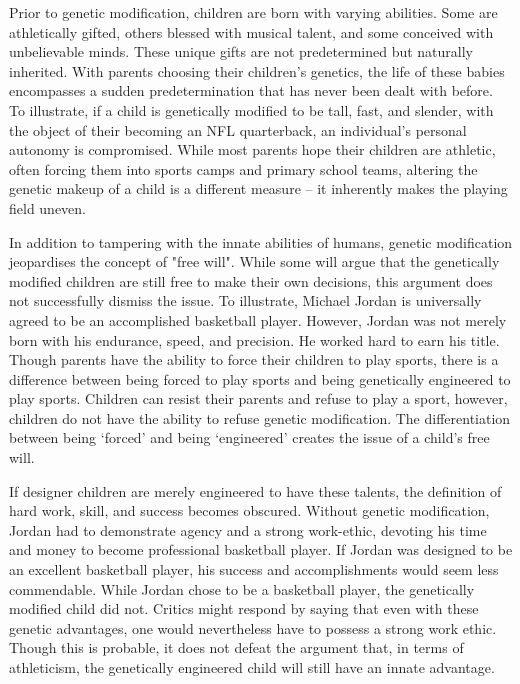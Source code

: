    Prior to genetic modification, children are born with varying
   abilities. Some are athletically gifted, others blessed with musical
   talent, and some conceived with unbelievable minds. These unique gifts
   are not predetermined but naturally inherited. With parents choosing
   their children's genetics, the life of these babies encompasses a
   sudden predetermination that has never been dealt with before. To
   illustrate, if a child is genetically modified to be tall, fast, and
   slender, with the object of their becoming an NFL quarterback, an
   individual's personal autonomy is compromised. While most parents hope
   their children are athletic, often forcing them into sports camps and
   primary school teams, altering the genetic makeup of a child is a
   different measure -- it inherently makes the playing field uneven.

   In addition to tampering with the innate abilities of humans, genetic
   modification jeopardises the concept of "free will".  While some will
   argue that the genetically modified children are still free to make
   their own decisions, this argument does not successfully dismiss the
   issue. To illustrate, Michael Jordan is universally agreed to be an
   accomplished basketball player. However, Jordan was not merely born
   with his endurance, speed, and precision. He worked hard to earn his
   title. Though parents have the ability to force their children to play
   sports, there is a difference between being forced to play sports and
   being genetically engineered to play sports. Children can resist their
   parents and refuse to play a sport, however, children do not have the
   ability to refuse genetic modification. The differentiation between
   being `forced' and being `engineered' creates the issue of a child's
   free will.

   If designer children are merely engineered to have these talents, the
   definition of hard work, skill, and success becomes obscured. Without
   genetic modification, Jordan had to demonstrate agency and a strong
   work-ethic, devoting his time and money to become professional
   basketball player. If Jordan was designed to be an excellent basketball
   player, his success and accomplishments would seem less commendable.
   While Jordan chose to be a basketball player, the genetically modified
   child did not. Critics might respond by saying that even with these
   genetic advantages, one would nevertheless have to possess a strong
   work ethic. Though this is probable, it does not defeat the argument
   that, in terms of athleticism, the genetically engineered child will
   still have an innate advantage.

